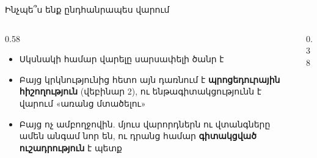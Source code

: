 \begin{frame}{Ինչպե՞ս ենք ընդհանրապես վարում}
  \begin{columns}[c]
    \begin{column}{0.58\textwidth}
      \begin{itemize}
        \item Սկսնակի համար վարելը սարսափելի ծանր է
        \item<2-> Բայց կրկնությունից հետո այն դառնում է \textbf{պրոցեդուրային հիշողություն} (վեբինար 2), ու ենթագիտակցությունն է վարում «առանց մտածելու»
        \item<3-> Բայց ոչ ամբողջովին. մյուս վարորդներն ու վտանգները ամեն անգամ նոր են, ու դրանց համար \textbf{գիտակցված ուշադրություն} է պետք
      \end{itemize}
    \end{column}
    \begin{column}{0.38\textwidth}
      \centering
      \par\medskip
    \end{column}
  \end{columns}
\end{frame}


